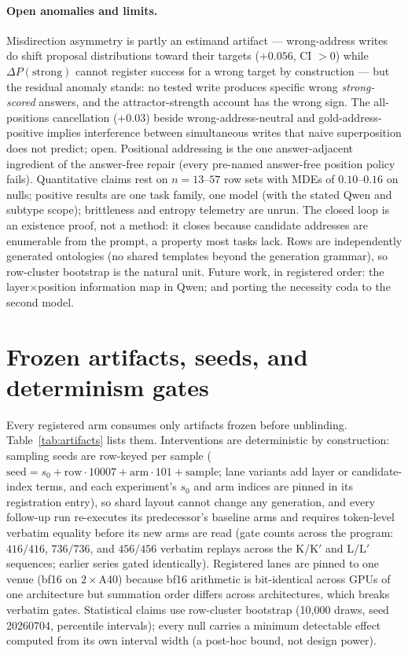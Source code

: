 \documentclass{article} %
\begin{document}
\paragraph{Open anomalies and limits.} Misdirection asymmetry is
partly an estimand artifact --- wrong-address writes do shift
proposal distributions toward their targets ($+0.056$, CI $>0$)
while $\Delta P(\text{strong})$ cannot register success for a wrong
target by construction --- but the residual anomaly stands: no
tested write produces specific wrong \emph{strong-scored} answers,
and the attractor-strength account has the wrong sign. The
all-positions cancellation ($+0.03$) beside wrong-address-neutral
and gold-address-positive implies interference between simultaneous
writes that naive superposition does not predict; open. Positional
addressing is the one answer-adjacent ingredient of the answer-free
repair (every pre-named answer-free position policy fails).
Quantitative claims rest on $n{=}13$--$57$ row sets with MDEs of
$0.10$--$0.16$ on nulls; positive results are one task family, one
model (with the stated Qwen and subtype scope); brittleness and
entropy telemetry are unrun. The closed loop is an existence proof,
not a method: it closes because candidate addresses are enumerable
from the prompt, a property most tasks lack. Rows are independently
generated ontologies (no shared templates beyond the generation
grammar), so row-cluster bootstrap is the natural unit. Future work,
in registered order: the
layer$\times$position information map in Qwen;
and porting the necessity coda to the second model.




\appendix

\section{Frozen artifacts, seeds, and determinism gates}\label{app:artifacts}

Every registered arm consumes only artifacts frozen before unblinding.
Table~\ref{tab:artifacts} lists them. Interventions are deterministic by
construction: sampling seeds are row-keyed per sample
($\mathrm{seed} = s_0 + \mathrm{row}\cdot 10007 + \mathrm{arm}\cdot
101 + \mathrm{sample}$; lane variants add layer or candidate-index
terms, and each experiment's $s_0$ and arm indices are pinned in its
registration entry),
so shard layout cannot change any generation, and every follow-up run
re-executes its predecessor's baseline arms and requires token-level
verbatim equality before its new arms are read (gate counts across the
program: $416/416$, $736/736$, and $456/456$ verbatim replays across the
K/K$'$ and L/L$'$ sequences; earlier series gated identically). Registered
lanes are pinned to one venue (bf16 on $2\times$A40) because bf16
arithmetic is bit-identical across GPUs of one architecture but summation
order differs across architectures, which breaks verbatim gates.
Statistical claims use row-cluster bootstrap (10{,}000 draws, seed
20260704, percentile intervals); every null carries a minimum detectable
effect computed from its own interval width (a post-hoc bound, not
design power).
\end{document}
